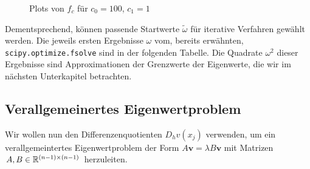 \begin{figure}[H]
  \centering
  \hspace{0mm}
  \caption{Plots von $f_c$ für $c_0 = 100$, $c_1 = 1$}
  \label{fig:zero_function}
\end{figure}

Dementsprechend, können passende Startwerte $\tilde{\omega}$ für iterative Verfahren gewählt werden. Die jeweils ersten Ergebnisse $\omega$ vom, bereits erwähnten, \verb|scipy.optimize.fsolve| sind in der folgenden Tabelle. Die Quadrate $\omega^2$ dieser Ergebnisse sind Approximationen der Grenzwerte der Eigenwerte, die wir im nächsten Unterkapitel betrachten. \\


\vspace{10pt}

\subsection{Verallgemeinertes Eigenwertproblem}

Wir wollen nun den Differenzenquotienten $D_h v(x_j)$ verwenden, um ein verallgemeintertes Eigenwertproblem der Form $A \mathbf{v} = \lambda B \mathbf{v}$ mit Matrizen $A, B \in \mathbb{R}^{(n-1) \times (n-1)}$ herzuleiten. \\

